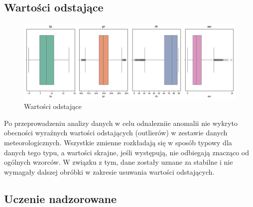 \documentclass[10pt,a4paper]{article}
\begin{document}
\subsection*{Wartości odstające}
\begin{figure}[h]
	\centering
	\includegraphics[scale=0.5]{boxplot.png}
	\caption{Wartości odstające}
	\label{fig:my_label}
\end{figure}
\noindent Po przeprowadzeniu analizy danych w celu odnalezniie anomalii nie wykryto obecności wyraźnych wartości odstających (outlierów) w zestawie danych meteorologicznych. Wszystkie zmienne rozkładają się w sposób typowy dla danych tego typu, a wartości skrajne, jeśli występują, nie odbiegają znacząco od ogólnych wzorców. W związku z tym, dane zostały uznane za stabilne i nie wymagały dalszej obróbki w zakresie usuwania wartości odstających.

\newpage

\subsection{Uczenie nadzorowane}
\end{document}
